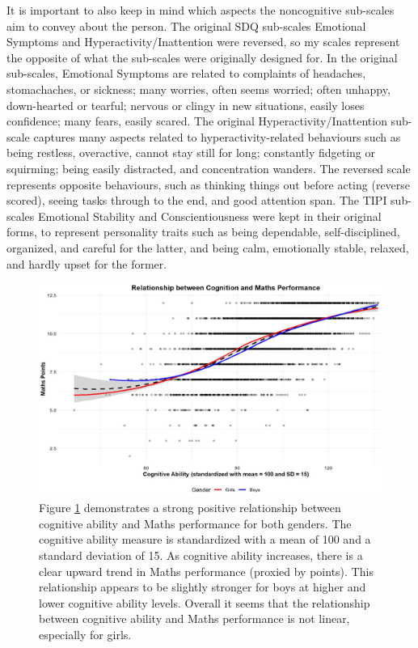 \documentclass[12pt,a4paper,onecolumn]{article}
\numberwithin{equation}{section}
\begin{document}
It is important to also keep in mind which aspects the noncognitive sub-scales aim to convey about the person. The original SDQ sub-scales Emotional Symptoms and Hyperactivity/Inattention were reversed, so my scales represent the opposite of what the sub-scales were originally designed for. In the original sub-scales, Emotional Symptoms are related to complaints of headaches, stomachaches, or sickness; many worries, often seems worried; often unhappy, down-hearted or tearful; nervous or clingy in new situations, easily loses confidence; many fears, easily scared. The original Hyperactivity/Inattention sub-scale captures many aspects related to hyperactivity-related behaviours such as being restless, overactive, cannot stay still for long; constantly fidgeting or squirming; being easily distracted, and concentration wanders. The reversed scale represents opposite behaviours, such as thinking things out before acting (reverse scored), seeing tasks through to the end, and good attention span. The TIPI sub-scales Emotional Stability and Conscientiousness were kept in their original forms, to represent personality traits such as being dependable, self-disciplined, organized, and careful for the latter, and being calm, emotionally stable, relaxed, and hardly upset for the former. 


\begin{figure}[ht] 
    \centering
    \includegraphics[width=1\linewidth]{production_function_maths_cog.JPG}
    \caption{Figure \ref{fig:cog_maths} demonstrates a strong positive relationship between cognitive ability and Maths performance for both genders. The cognitive ability measure is standardized with a mean of 100 and a standard deviation of 15. As cognitive ability increases, there is a clear upward trend in Maths performance (proxied by points). This relationship appears to be slightly stronger for boys at higher and lower cognitive ability levels. Overall it seems that the relationship between cognitive ability and Maths performance is not linear, especially for girls.}
    \label{fig:cog_maths}
\end{figure}
\end{document}

